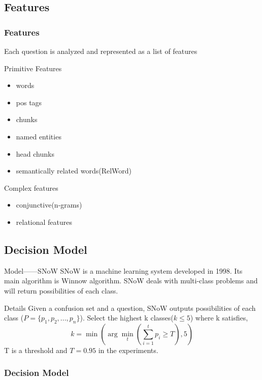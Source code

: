 \documentclass{beamer}
\begin{document}
    \subsection{Features}
    \begin{frame}
        \frametitle{Features}
        \begin{block}{}
            Each question is analyzed and 
            represented as a list of features
        \end{block}
        \begin{block}{Primitive Features}
            \begin{itemize}
                \item words
                \item pos tags 
                \item chunks 
                \item named entities
                \item head chunks 
                \item semantically related words(RelWord)
            \end{itemize}
        \end{block}
        \begin{block}{Complex features}
            \begin{itemize}
                \item conjunctive(n-grams)
                \item relational features
            \end{itemize}
        \end{block}
    \end{frame}


    \subsection{Decision Model}
    \begin{frame}
        \begin{block}{Model——SNoW}
            SNoW is a machine learning system 
            developed in 1998. Its main algorithm
            is Winnow algorithm. SNoW deals with 
            multi-class problems and will return 
            possibilities of each class.
        \end{block}

        \begin{block}{Details}
            Given a confusion set and a question,
            SNoW outputs possibilities of each class
            ($P=\{p_1,p_2,...,p_n\}$).
            Select the highest k classes($k \leq 5$) where
            k satisfies, 
            \[
                k = \min(\arg\min_t(\sum_{i=1}^{t}p_i \geq T),5)
            \]
            T is a threshold and $T=0.95$ in the experiments.
        \end{block}


    \frametitle{Decision Model}
        
    \end{frame}
\end{document}
